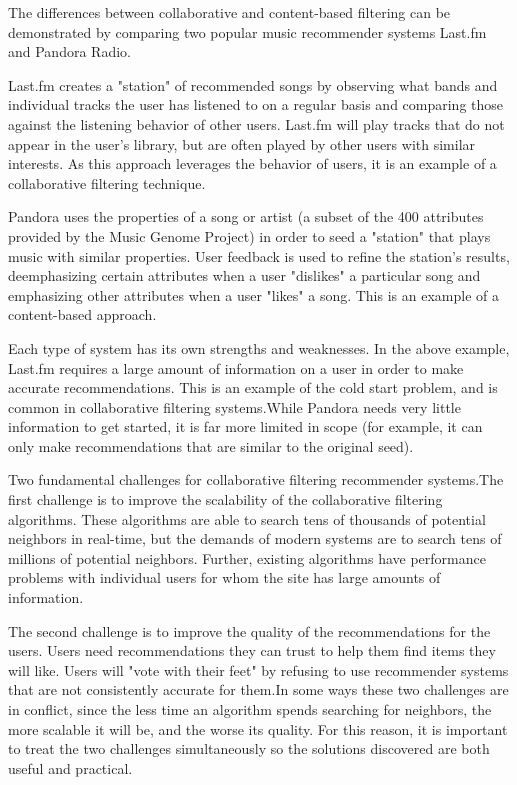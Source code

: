 \documentclass[paper=a4, fontsize=11pt]{scrartcl}
\numberwithin{equation}{section}		%
\numberwithin{figure}{section}			%
\numberwithin{table}{section}				%
\begin{document}
The differences between collaborative and content-based filtering can be demonstrated by comparing two popular music recommender systems Last.fm and Pandora Radio.

Last.fm creates a "station" of recommended songs by observing what bands and individual tracks the user has listened to on a regular basis and comparing those against the listening behavior of other users. Last.fm will play tracks that do not appear in the user's library, but are often played by other users with similar interests. As this approach leverages the behavior of users, it is an example of a collaborative filtering technique.

Pandora uses the properties of a song or artist (a subset of the 400 attributes provided by the Music Genome Project) in order to seed a "station" that plays music with similar properties. User feedback is used to refine the station's results, deemphasizing certain attributes when a user "dislikes" a particular song and emphasizing other attributes when a user "likes" a song. This is an example of a content-based approach.

Each type of system has its own strengths and weaknesses. In the above example, Last.fm requires a large amount of information on a user in order to make accurate recommendations. This is an example of the cold start problem, and is common in collaborative filtering systems.While Pandora needs very little information to get started, it is far more limited in scope (for example, it can only make recommendations that are similar to the original seed).

Two fundamental challenges for collaborative filtering recommender systems.The first challenge is to improve the scalability of the collaborative filtering algorithms. These algorithms are able to search tens of thousands of potential neighbors in real-time, but the demands of modern systems are to search tens of millions of potential neighbors. Further, existing algorithms have performance problems with individual users for whom the site has large amounts of information.

The second challenge is to improve the quality of the recommendations for the users. Users need recommendations they can trust to help them find items they will like. Users will "vote with their feet" by refusing to use recommender systems that are not consistently accurate for them.In some ways these two challenges are in conflict, since the less time an algorithm spends searching for neighbors, the more scalable it will be, and the worse its quality. For this reason, it is important to treat the two challenges simultaneously so the solutions discovered are both useful and practical.
\end{document}
